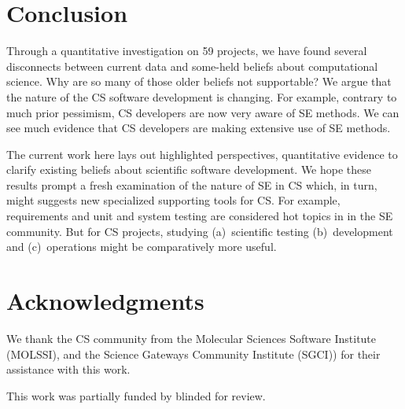 \documentclass[sigconf]{acmart}
\begin{document}
\section{Conclusion}

Through a quantitative investigation on 59 projects, we have found several disconnects between current data
and some-held beliefs about computational science.
Why are so many of those older beliefs not supportable?
We argue that  the  nature of the CS software development is changing. 
For example, contrary to much prior pessimism,
CS developers are now very
aware of SE methods. 
We can see much evidence that CS developers are making
extensive use of SE methods.

 
 The current work here lays out highlighted perspectives, quantitative evidence to clarify existing beliefs about scientific software development.
 We hope these results  prompt a fresh examination of the nature of SE in  CS which, in turn, might suggests 
  new   specialized supporting tools for CS.
For example, requirements and unit and system testing  are considered hot topics in in the SE community.
But for CS projects,   studying  (a)~scientific testing (b)~development and
(c)~operations might be comparatively more useful.





\section{Acknowledgments}

We thank the   CS community
from the Molecular Sciences Software Institute (MOLSSI), and the Science Gateways Community Institute (SGCI)) for
their assistance with this work.


This work was partially funded by 
blinded for review.

\balance


\end{document}
